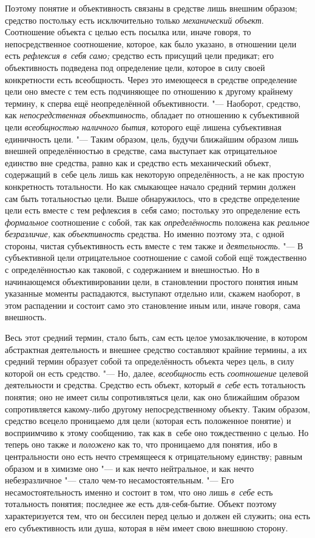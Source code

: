 Поэтому понятие и объективность связаны в средстве лишь
внешним образом; средство постольку есть исключительно только
{\em механический объект}.
Соотношение объекта с целью есть посылка или, иначе говоря,
то непосредственное соотношение, которое, как было указано, в отношении
цели есть {\em рефлексия в~себя само;}
средство есть присущий цели предикат; его объективность
подведена под определение цели, которое в силу своей конкретности есть
всеобщность. Через это имеющееся в средстве определение цели оно вместе с
тем есть подчиняющее по отношению к другому крайнему термину, к сперва ещё
неопределённой объективности. "--- Наоборот, средство, как
{\em непосредственная объективность,}
обладает по отношению к субъективной цели
{\em всеобщностью наличного бытия,}
которого ещё лишена субъективная единичность цели. "---
Таким образом, цель, будучи ближайшим образом лишь внешней
определённостью в средстве, сама выступает как отрицательное единство вне
средства, равно как и средство есть механический объект, содержащий в~себе
цель лишь как некоторую определённость, а не как простую конкретность
тотальности. Но как смыкающее начало средний термин должен сам быть
тотальностью цели. Выше обнаружилось, что в средстве определение цели есть
вместе с тем рефлексия в~себя само; постольку это определение есть
{\em формальное}
соотношение с собой, так как
{\em определённость}
положена как {\em реальное
безразличие,} как
{\em объективность}
средства. Но именно поэтому эта, с одной стороны, чистая
субъективность есть вместе с тем также и
{\em деятельность}. "--- В
субъективной цели отрицательное соотношение с самой собой ещё тождественно
с определённостью как таковой, с содержанием и внешностью. Но в
начинающемся объективировании цели, в становлении простого понятия иным
указанные моменты распадаются, выступают отдельно или, скажем наоборот, в
этом распадении и состоит само это становление иным или, иначе говоря, сама
внешность.

Весь этот средний термин, стало быть, сам есть целое
умозаключение, в котором абстрактная деятельность и внешнее средство
составляют крайние термины, а их средний термин образует собой та
определённость объекта через цель, в силу которой он есть средство. "---
Но, далее,
{\em всеобщность} есть
{\em соотношение} целевой
деятельности и средства. Средство есть объект, который
{\em в~себе} есть
тотальность понятия; оно не имеет силы сопротивляться цели, как оно
ближайшим образом сопротивляется какому-либо другому непосредственному
объекту. Таким образом, средство всецело проницаемо для цели (которая есть
положенное понятие) и восприимчиво к этому сообщению, так как в~себе оно
тождественно с целью. Но теперь оно также и
{\em положено} как то,
что проницаемо для понятия, ибо в центральности оно есть нечто стремящееся
к отрицательному единству; равным образом и в химизме оно
"--- и как нечто нейтральное, и как нечто небезразличное
"--- стало чем-то несамостоятельным. "--- Его
несамостоятельность именно и состоит в том, что оно лишь
{\em в~себе} есть
тотальность понятия; последнее же есть для-себя-бытие. Объект поэтому
характеризуется тем, что он бессилен перед целью и должен ей служить; она
есть его субъективность или душа, которая в нём имеет свою внешнюю сторону.

